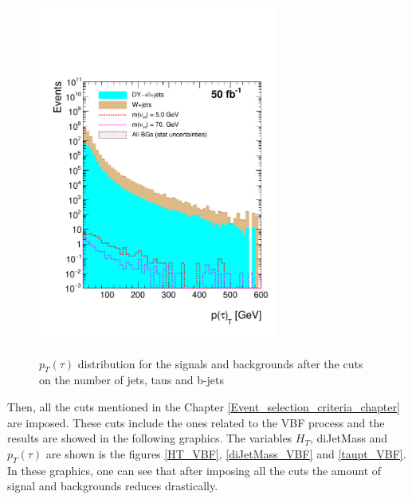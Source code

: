   \begin{figure}[h] 
 \centering
 \caption{$p_T(\tau)$ distribution for the signals and backgrounds after the cuts on the number of jets, taus and b-jets}
 \includegraphics[width=0.7\textwidth]{./Capitulos/Analysis/AfterBJets/TauPt_MET_20} 
 \label{taupt_bjets}
 \end{figure} 
 
 Then, all the cuts mentioned in the Chapter \ref{Event_selection_criteria_chapter} are imposed. These cuts include the ones related to the VBF process and the results are showed in the following 
 graphics. The variables $H_T$, diJetMass and $p_T(\tau)$ are shown is the figures \ref{HT_VBF}, \ref{diJetMass_VBF} and \ref{taupt_VBF}. In these graphics, one can see that after imposing all the 
 cuts the amount of signal and backgrounds reduces drastically. 
 
